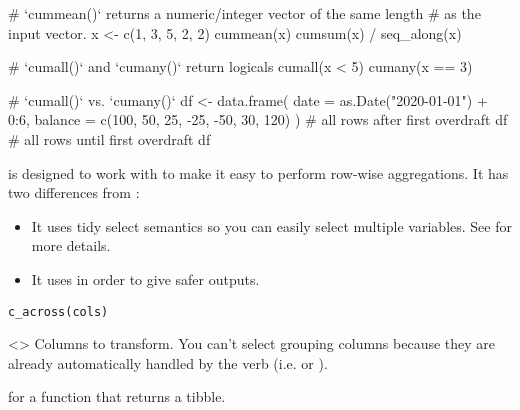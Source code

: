 \documentclass[a4paper]{book}
\begin{document}
%
\begin{Examples}
\begin{ExampleCode}
# `cummean()` returns a numeric/integer vector of the same length
# as the input vector.
x <- c(1, 3, 5, 2, 2)
cummean(x)
cumsum(x) / seq_along(x)

# `cumall()` and `cumany()` return logicals
cumall(x < 5)
cumany(x == 3)

# `cumall()` vs. `cumany()`
df <- data.frame(
  date = as.Date("2020-01-01") + 0:6,
  balance = c(100, 50, 25, -25, -50, 30, 120)
)
# all rows after first overdraft
df %
# all rows until first overdraft
df %

\end{ExampleCode}
\end{Examples}
%
\begin{Description}
 is designed to work with  to make it easy to
perform row-wise aggregations. It has two differences from :
\begin{itemize}

\item{} It uses tidy select semantics so you can easily select multiple variables.
See  for more details.
\item{} It uses  in order to give safer outputs.

\end{itemize}

\end{Description}
%
\begin{Usage}
\begin{verbatim}
c_across(cols)
\end{verbatim}
\end{Usage}
%
\begin{Arguments}
\begin{ldescription}
\item[\code{cols}] <> Columns to transform.
You can't select grouping columns because they are already automatically
handled by the verb (i.e.  or ).
\end{ldescription}
\end{Arguments}
%
\begin{SeeAlso}
 for a function that returns a tibble.
\end{SeeAlso}
\end{document}
